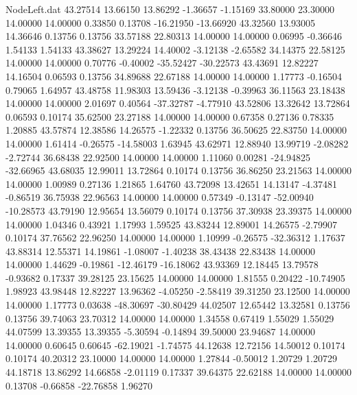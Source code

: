 \begin{filecontents}{NodeLeft.dat}
  43.27514   13.66150   13.86292    -1.36657   -1.15169   33.80000   23.30000   14.00000   14.00000    0.33850    0.13708  -16.21950  -13.66920
  43.32560   13.93005   14.36646     0.13756    0.13756   33.57188   22.80313   14.00000   14.00000    0.06995   -0.36646    1.54133    1.54133
  43.38627   13.29224   14.40002    -3.12138   -2.65582   34.14375   22.58125   14.00000   14.00000    0.70776   -0.40002  -35.52427  -30.22573
  43.43691   12.82227   14.16504     0.06593    0.13756   34.89688   22.67188   14.00000   14.00000    1.17773   -0.16504    0.79065    1.64957
  43.48758   11.98303   13.59436    -3.12138   -0.39963   36.11563   23.18438   14.00000   14.00000    2.01697    0.40564  -37.32787   -4.77910
  43.52806   13.32642   13.72864     0.06593    0.10174   35.62500   23.27188   14.00000   14.00000    0.67358    0.27136    0.78335    1.20885
  43.57874   12.38586   14.26575    -1.22332    0.13756   36.50625   22.83750   14.00000   14.00000    1.61414   -0.26575  -14.58003    1.63945
  43.62971   12.88940   13.99719    -2.08282   -2.72744   36.68438   22.92500   14.00000   14.00000    1.11060    0.00281  -24.94825  -32.66965
  43.68035   12.99011   13.72864     0.10174    0.13756   36.86250   23.21563   14.00000   14.00000    1.00989    0.27136    1.21865    1.64760
  43.72098   13.42651   14.13147    -4.37481   -0.86519   36.75938   22.96563   14.00000   14.00000    0.57349   -0.13147  -52.00940  -10.28573
  43.79190   12.95654   13.56079     0.10174    0.13756   37.30938   23.39375   14.00000   14.00000    1.04346    0.43921    1.17993    1.59525
  43.83244   12.89001   14.26575    -2.79907    0.10174   37.76562   22.96250   14.00000   14.00000    1.10999   -0.26575  -32.36312    1.17637
  43.88314   12.55371   14.19861    -1.08007   -1.40238   38.43438   22.83438   14.00000   14.00000    1.44629   -0.19861  -12.46179  -16.18062
  43.93369   12.18445   13.79578    -0.93682    0.17337   39.28125   23.15625   14.00000   14.00000    1.81555    0.20422  -10.74905    1.98923
  43.98448   12.82227   13.96362    -4.05250   -2.58419   39.31250   23.12500   14.00000   14.00000    1.17773    0.03638  -48.30697  -30.80429
  44.02507   12.65442   13.32581     0.13756    0.13756   39.74063   23.70312   14.00000   14.00000    1.34558    0.67419    1.55029    1.55029
  44.07599   13.39355   13.39355    -5.30594   -0.14894   39.50000   23.94687   14.00000   14.00000    0.60645    0.60645  -62.19021   -1.74575
  44.12638   12.72156   14.50012     0.10174    0.10174   40.20312   23.10000   14.00000   14.00000    1.27844   -0.50012    1.20729    1.20729
  44.18718   13.86292   14.66858    -2.01119    0.17337   39.64375   22.62188   14.00000   14.00000    0.13708   -0.66858  -22.76858    1.96270

\end{filecontents}
